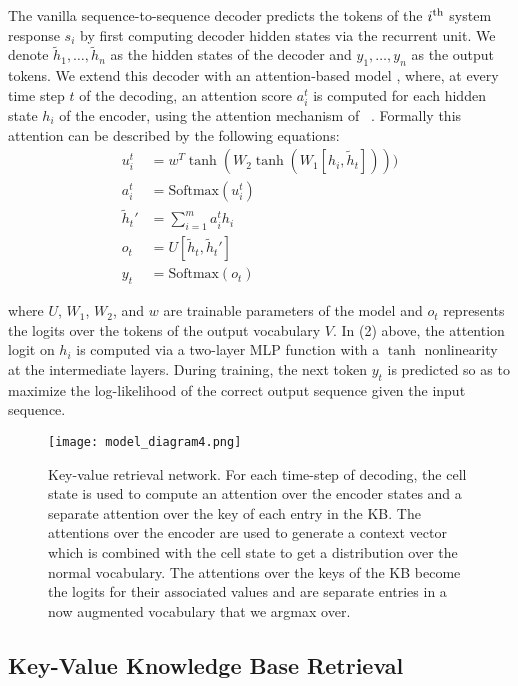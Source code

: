 \documentclass[11pt,a4paper]{article}
\newcommand{\whethermath}[1]{\ifmmode{#1}\else{$#1$}\fi}
\newcommand{\uprm}[1]{\whethermath{^{\mbox{\scriptsize #1}}}}
\begin{document}
The vanilla sequence-to-sequence decoder predicts the tokens of the $i\uprm{th}$ system response $s_i$ by first computing decoder hidden states via the recurrent unit. We denote $\tilde h_1, \ldots, \tilde h_n$ as the hidden states of the decoder and $y_1, \ldots, y_n$ as the output tokens.  We extend this decoder with an attention-based model \cite{Bahdanau:14,Luong:15a}, where, at every time step $t$ of the decoding, an attention score $a_{i}^t$ is computed for each hidden state $h_i$ of the encoder, using the attention mechanism of ~\cite{NIPS2015_5635}. Formally this attention can be described by the following equations:
    \begin{align}
          u_i^t &= w^T \tanh(W_2\tanh(W_1[h_i, \tilde h_t]))) \\
          a_i^t &= \textrm{Softmax}(u_i^t)\\
          \tilde h_t' &= \displaystyle \sum_{i=1}^m a_i^th_i \\
          o_t &= U[\tilde h_t, \tilde h_t'] \\
          y_t &= \textrm{Softmax}(o_t)
    \end{align}

  \noindent where $U$, $W_1$, $W_2$, and $w$ are trainable parameters of the model and $o_t$ represents the logits over the tokens of the output vocabulary $V$. In (2) above, the attention logit on $h_i$ is computed via a two-layer MLP function with a $\tanh$ nonlinearity at the intermediate layers.  During training, the next token $y_t$ is predicted so as to maximize the log-likelihood of the correct output sequence given the input sequence.

  \begin{figure*}[ht]
    \texttt{[image: model\_diagram4.png]}
    \caption{Key-value retrieval network. For each time-step of decoding, the cell state is used to compute an attention over the encoder states and a separate attention over the key of each entry in the KB. The attentions over the encoder are used to generate a context vector which is combined with the cell state to get a distribution over the normal vocabulary. The attentions over the keys of the KB become the logits for their associated values and are separate entries in a now augmented vocabulary that we argmax over.}
  \end{figure*}


\subsection{Key-Value Knowledge Base Retrieval}
\end{document}
